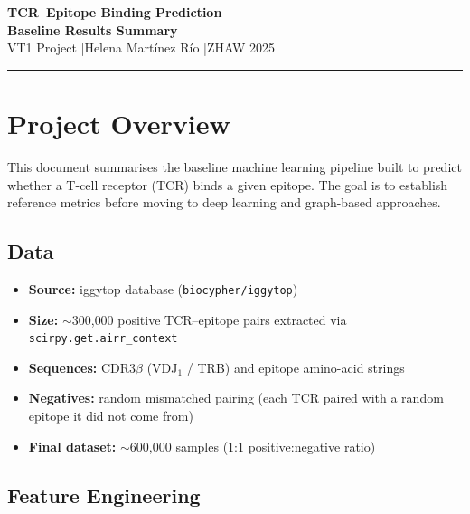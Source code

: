 \documentclass[11pt,a4paper]{article}
\begin{document}
\begin{center}
  {\LARGE\bfseries\color{mainblue} TCR--Epitope Binding Prediction}\\[6pt]
  {\large\bfseries\color{darkgray} Baseline Results Summary}\\[8pt]
  {\small\color{gray} VT1 Project \quad|\quad Helena Mart\'inez R\'io \quad|\quad ZHAW 2025}
\end{center}

\vspace{6pt}
\textcolor{mainblue}{\rule{\linewidth}{1.5pt}}
\vspace{12pt}

\section{Project Overview}

This document summarises the baseline machine learning pipeline built to predict
whether a T-cell receptor (TCR) binds a given epitope.
The goal is to establish reference metrics before moving to deep learning and
graph-based approaches.

\subsection{Data}
\begin{itemize}[leftmargin=1.4em, itemsep=2pt]
  \item \textbf{Source:} iggytop database (\texttt{biocypher/iggytop})
  \item \textbf{Size:} $\sim$300{,}000 positive TCR--epitope pairs extracted
        via \texttt{scirpy.get.airr\_context}
  \item \textbf{Sequences:} CDR3$\beta$ (VDJ$_1$ / TRB) and epitope amino-acid strings
  \item \textbf{Negatives:} random mismatched pairing (each TCR paired with
        a random epitope it did not come from)
  \item \textbf{Final dataset:} $\sim$600{,}000 samples (1:1 positive:negative ratio)
\end{itemize}

\subsection{Feature Engineering}
\end{document}
